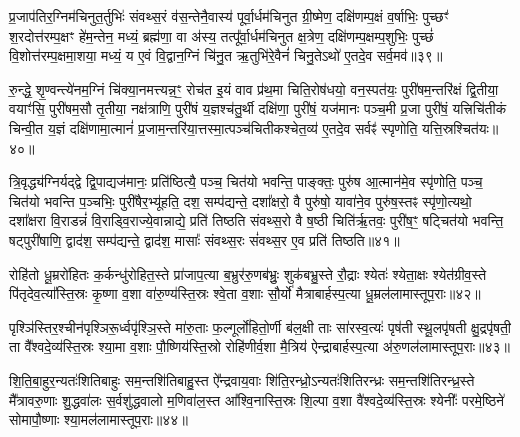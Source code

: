 {\anuvakamend[{षो॒ढा॒वि॒हि॒तो वै वै᳚ष्ण॒वीर॒न्यो विꣳ॑श॒तिश्च॑॥९॥}]}

प्र॒जाप॑तिर॒ग्निम॑चिनुत॒र्तुभिः॑ संवथ्स॒रं व॑स॒न्तेनै॒वास्य॑ पूर्वा॒र्धम॑चिनुत ग्री॒ष्मेण॒ दक्षि॑णम्प॒क्षं व॒र्\mbox{}षाभिः॒ पुच्छꣳ॑ श॒रदोत्त॑रम्प॒क्षꣳ हे॑म॒न्तेन॒ मध्यं॒ ब्रह्म॑णा॒ वा अ॑स्य॒ तत्पू᳚र्वा॒र्धम॑चिनुत क्ष॒त्रेण॒ दक्षि॑णम्प॒क्षम्प॒शुभिः॒ पुच्छं॑ वि॒शोत्त॑रम्प॒क्षमा॒शया॒ मध्यं॒ य ए॒वं वि॒द्वान॒ग्निं चि॑नु॒त ऋ॒तुभि॑रे॒वैनं॑ चिनु॒ते\-ऽथो॑ ए॒तदे॒व सर्व॒मव॑॥३९॥

रु॒न्द्धे॒ शृ॒ण्वन्त्ये॑नम॒ग्निं चि॑क्या॒नमत्त्यन्न॒ꣳ॒ रोच॑त इ॒यं वाव प्र॑थ॒मा चिति॒रोष॑धयो॒ वन॒स्पत॑यः॒ पुरी॑षम॒न्तरि॑क्षं द्वि॒तीया॒ वयाꣳ॑सि॒ पुरी॑षम॒सौ तृ॒तीया॒ नक्ष॑त्राणि॒ पुरी॑षं य॒ज्ञश्च॑तु॒र्थी दक्षि॑णा॒ पुरी॑षं॒ यज॑मानः पञ्च॒मी प्र॒जा पुरी॑षं॒ यत्त्रिचि॑तीकं चिन्वी॒त य॒ज्ञं दक्षि॑णामा॒त्मानं॑ प्र॒जाम॒न्तरि॑या॒त्तस्मा॒त्पञ्च॑चितीकश्चेत॒व्य॑ ए॒तदे॒व सर्वꣴ॑ स्पृणोति॒ यत्ति॒स्रश्चित॑यः॥४०॥

त्रि॒वृद्ध्य॑ग्निर्यद्द्वे द्वि॒पाद्यज॑मानः॒ प्रति॑ष्ठित्यै॒ पञ्च॒ चित॑यो भवन्ति॒ पाङ्क्तः॒ पुरु॑ष आ॒त्मान॑मे॒व स्पृ॑णोति॒ पञ्च॒ चित॑यो भवन्ति प॒ञ्चभिः॒ पुरी॑षैर॒भ्यू॑हति॒ दश॒ सम्प॑द्यन्ते॒ दशा᳚क्षरो॒ वै पुरु॑षो॒ यावा॑ने॒व पुरु॑ष॒स्तꣴ स्पृ॑णो॒त्यथो॒ दशा᳚क्षरा वि॒राडन्नं॑ वि॒राड्वि॒राज्ये॒वान्नाद्ये॒ प्रति॑ तिष्ठति संवथ्स॒रो वै ष॒ष्ठी चिति॑र्\mbox{}ऋ॒तवः॒ पुरी॑ष॒ꣳ॒ षट्चित॑यो भवन्ति॒ षट्पुरी॑षाणि॒ द्वाद॑श॒ सम्प॑द्यन्ते॒ द्वाद॑श॒ मासाः᳚ संवथ्स॒रः सं॑वथ्स॒र ए॒व प्रति॑ तिष्ठति॥४१॥

{\anuvakamend[{अव॒ चित॑यः॒ पुरी॑षं॒ पञ्च॑दश च॥10॥}]}

रोहि॑तो धू॒म्ररो॑हितः क॒र्कन्धु॑रोहित॒स्ते प्रा॑जाप॒त्या ब॒भ्रुर॑रु॒णब॑भ्रुः॒ शुक॑बभ्रु॒स्ते रौ॒द्राः श्येतः॑ श्येता॒क्षः श्येत॑ग्रीव॒स्ते पि॑तृदेव॒त्या᳚स्ति॒स्रः कृ॒ष्णा व॒शा वा॑रु॒ण्य॑स्ति॒स्रः श्वे॒ता व॒शाः सौ॒र्यो॑ मैत्राबार्\mbox{}हस्प॒त्या धू॒म्रल॑लामास्तूप॒राः॥४२॥

{\anuvakamend[{॥11॥}]}

पृश्ञि॑स्तिर॒श्चीन॑पृश्ञिरू॒र्ध्वपृ॑श्ञि॒स्ते मा॑रु॒ताः फ॒ल्गूर्लो॑हितो॒र्णी ब॑ल॒क्षी ताः सा॑रस्व॒त्यः॑ पृष॑ती स्थू॒लपृ॑षती क्षु॒द्रपृ॑षती॒ ता वै᳚श्वदे॒व्य॑स्ति॒स्रः श्या॒मा व॒शाः पौ॒ष्णिय॑स्ति॒स्रो रोहि॑णीर्व॒शा मै॒त्रिय॑ ऐन्द्राबार्\mbox{}हस्प॒त्या अ॑रु॒णल॑लामास्तूप॒राः॥४३॥

{\anuvakamend[{रोहि॑तः॒ पृश्ञि॒ष्षड्विꣳ॑शति॒ष्षड्विꣳ॑शतिः॥12॥}]}

शि॒ति॒बा॒हुर॒न्यतः॑शितिबाहुः सम॒न्तशि॑तिबाहु॒स्त ऐ᳚न्द्रवाय॒वाः शि॑ति॒रन्ध्रो॒\-ऽन्यतः॑शितिरन्ध्रः सम॒न्तशि॑तिरन्ध्र॒स्ते मै᳚त्रावरु॒णाः शु॒द्धवा॑लः स॒र्वशु॑द्धवालो म॒णिवा॑ल॒स्त आ᳚श्वि॒नास्ति॒स्रः शि॒ल्पा व॒शा वै॑श्वदे॒व्य॑स्ति॒स्रः श्येनीः᳚ परमे॒ष्ठिने॑ सोमापौ॒ष्णाः श्या॒मल॑लामास्तूप॒राः॥४४॥

